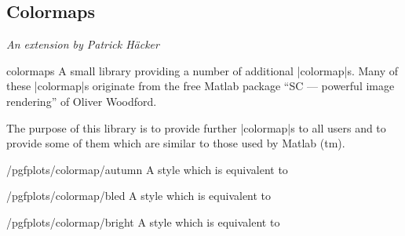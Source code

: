 \subsection{Colormaps}

{\emph{An extension by Patrick H\"acker}}


\begin{pgfplotslibrary}{colormaps}
	A small library providing a number of additional |colormap|s. Many of these |colormap|s originate from the free Matlab package ``SC --- powerful image rendering'' of Oliver Woodford.
	
	The purpose of this library is to provide further |colormap|s to all users and to provide some of them which are similar to those used by Matlab (tm).

\begin{stylekey}{/pgfplots/colormap/autumn}
	A style which is equivalent to 
\begin{codeexample}
\end{codeexample}


	\matlabcolormaptext
\end{stylekey}

\begin{stylekey}{/pgfplots/colormap/bled}
	A style which is equivalent to 
\begin{codeexample}
\end{codeexample}


	\matlabcolormaptext
\end{stylekey}

\begin{stylekey}{/pgfplots/colormap/bright}
	A style which is equivalent to 
\begin{codeexample}
\end{codeexample}


	\matlabcolormaptext
\end{stylekey}


\end{pgfplotslibrary}
